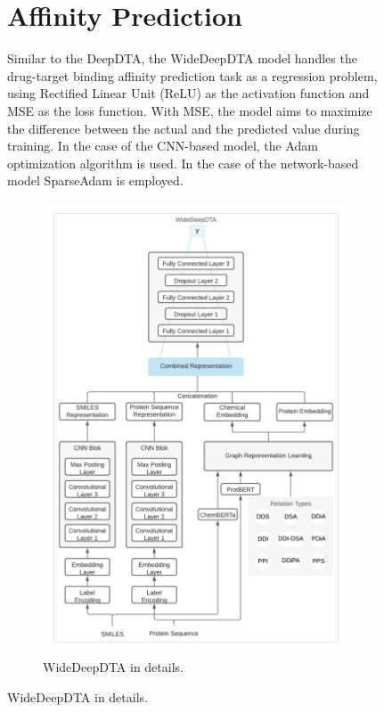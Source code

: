 \begin{figure}[h]
\section{Affinity Prediction}
Similar to the DeepDTA, the WideDeepDTA model handles the drug-target binding affinity prediction task as a regression problem, using Rectified Linear Unit (ReLU) \cite{nair2010rectified} as the activation function and MSE as the loss function. With MSE, the model aims to maximize the difference between the actual and the predicted value during training. In the case of the CNN-based model, the Adam optimization algorithm \cite{kingma2014adam} is used. In the case of the network-based model
SparseAdam is employed. 

\begin{figure}[t]
    \centering
        \includegraphics[width=\linewidth]{chapters/materials_and_methods/figures/WiderDeepDTA Model.png}
    \caption{WideDeepDTA in details.}
    \label{fig:widedeepdtamodel}
\end{figure}



\end{figure}

